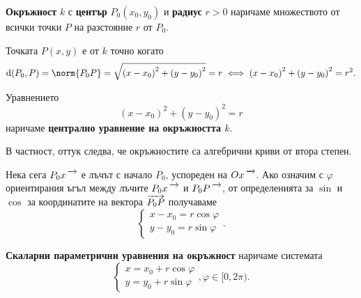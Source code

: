 \documentclass{../../common/topic}
\begin{document}
\begin{definition}
  \textbf{Окръжност} \( k \) с \textbf{център} \( P_0(x_0, y_0) \) и \textbf{радиус} \( r > 0 \) наричаме множеството от всички точки \( P \) на разстояние \( r \) от \( P_0 \).

  Точката \( P(x, y) \) е от \( k \) точно когато
  \begin{equation*}
    \dist(P_0, P)
    =
    \norm{P_0 P}
    =
    \sqrt{{(x - x_0)}^2 + {(y - y_0)}^2} = r
    \iff
    {(x - x_0)}^2 + {(y - y_0)}^2 = r^2.
  \end{equation*}

  Уравнението
  \begin{equation*}
    {(x - x_0)}^2 + {(y - y_0)}^2 = r
  \end{equation*}
  наричаме \textbf{централно уравнение на окръжността \( k \)}.

  В частност, оттук следва, че окръжностите са алгебрични криви от втора степен.

  \par
  \begin{minipage}{0.45\textwidth}
    Нека сега \( \ray{P_0 x} \) е лъчът с начало \( P_0 \), успореден на \( \ray{Ox} \). Ако означим с \( \varphi \) ориентирания ъгъл между лъчите \( \ray{P_0x} \) и \( \ray{P_0 P} \), от определенията за \( \sin \) и \( \cos \) за координатите на вектора \( \overrightarrow{P_0 P} \) получаваме
    \begin{equation*}
      \begin{cases}
        x - x_0 = r \cos \varphi \\
        y - y_0 = r \sin \varphi
      \end{cases}.
    \end{equation*}

    \textbf{Скаларни параметрични уравнения на окръжност} наричаме системата
    \begin{equation*}
      \begin{cases}
        x = x_0 + r \cos \varphi \\
        y = y_0 + r \sin \varphi
      \end{cases},
      \varphi \in [0, 2\pi).
    \end{equation*}

    \vspace{0.5cm}
  \end{minipage}
  \hspace{0.5cm}
  \begin{minipage}{0.45\textwidth}
    \begin{figure}[H]
      \centering
\end{figure}
\end{minipage}
\end{definition}
\end{document}
